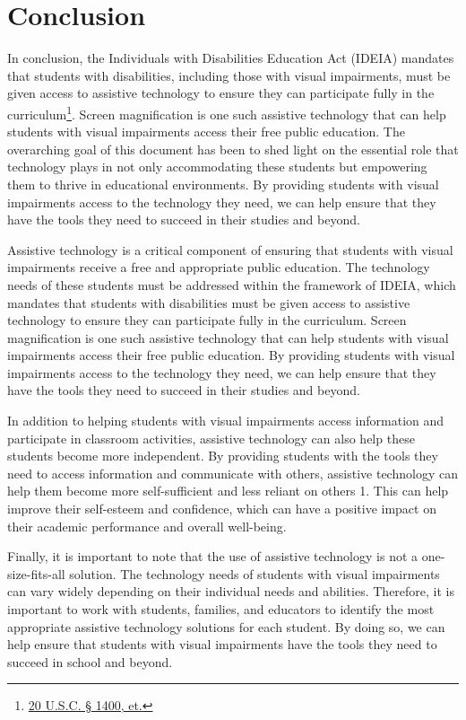 \hypertarget{conclusion}{}\chapter[\raggedright Conclusion\hfill\break ]{Conclusion}\label{conclusion}
\noindent\makebox[\linewidth]{\rule{\linewidth}{0.4pt}}
In conclusion, the Individuals with Disabilities Education Act (IDEIA) mandates that students with disabilities, including those with visual impairments, must be given access to assistive technology to ensure they can participate fully in the curriculum\footnote{\raggedright \href{http://sites.ed.gov/idea/statuteregulations/}{20 U.S.C. § 1400, et.}}. Screen magnification is one such assistive technology that can help students with visual impairments access their free public education. The overarching goal of this document has been to shed light on the essential role that technology plays in not only accommodating these students but empowering them to thrive in educational environments. By providing students with visual impairments access to the technology they need, we can help ensure that they have the tools they need to succeed in their studies and beyond.

Assistive technology is a critical component of ensuring that students with visual impairments receive a free and appropriate public education. The technology needs of these students must be addressed within the framework of IDEIA, which mandates that students with disabilities must be given access to assistive technology to ensure they can participate fully in the curriculum. Screen magnification is one such assistive technology that can help students with visual impairments access their free public education. By providing students with visual impairments access to the technology they need, we can help ensure that they have the tools they need to succeed in their studies and beyond.

In addition to helping students with visual impairments access information and participate in classroom activities, assistive technology can also help these students become more independent. By providing students with the tools they need to access information and communicate with others, assistive technology can help them become more self-sufficient and less reliant on others 1. This can help improve their self-esteem and confidence, which can have a positive impact on their academic performance and overall well-being.

Finally, it is important to note that the use of assistive technology is not a one-size-fits-all solution. The technology needs of students with visual impairments can vary widely depending on their individual needs and abilities. Therefore, it is important to work with students, families, and educators to identify the most appropriate assistive technology solutions for each student. By doing so, we can help ensure that students with visual impairments have the tools they need to succeed in school and beyond.

